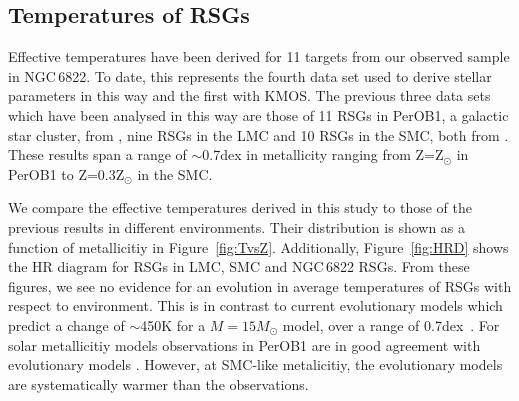 \documentclass[manuscript]{aastex}
\begin{document}


\subsection{Temperatures of RSGs} %
\label{sub:temperatures_of_rsgs}

Effective temperatures have been derived for 11 targets from our observed sample in NGC\,6822.
To date, this represents the fourth data set used to derive stellar parameters in this way and the first with KMOS.
The previous three data sets which have been analysed in this way are those of 11 RSGs in PerOB1,
a galactic star cluster, from
\cite{2014ApJ...788...58G}, nine RSGs in the LMC and 10 RSGs in the SMC, both from
\cite{Davies14}.
These results span a range of $\sim$0.7dex in metallicity ranging from Z=Z$_{\odot}$ in PerOB1 to Z=0.3Z$_{\odot}$ in the SMC.

We compare the effective temperatures derived in this study to those of the previous results in different environments.
Their distribution is shown as a function of metallicitiy in Figure~\ref{fig:TvsZ}.
Additionally, Figure~\ref{fig:HRD} shows the HR diagram for RSGs in LMC, SMC and NGC\,6822 RSGs.
From these figures, we see no evidence for an evolution in average temperatures of RSGs with respect to environment.
This is in contrast to current evolutionary models which predict a change of $\sim$450K for a $M=15M_{\odot}$ model,
over a range of 0.7dex~\citep{Ekstrom12,2013A&A...558A.103G}.
For solar metallicitiy models observations in PerOB1 are in good agreement with evolutionary models
\citep[see Figure 9 in][]{2014ApJ...788...58G}.
However, at SMC-like metalicitiy, the evolutionary models are systematically warmer than the observations.
\end{document}
